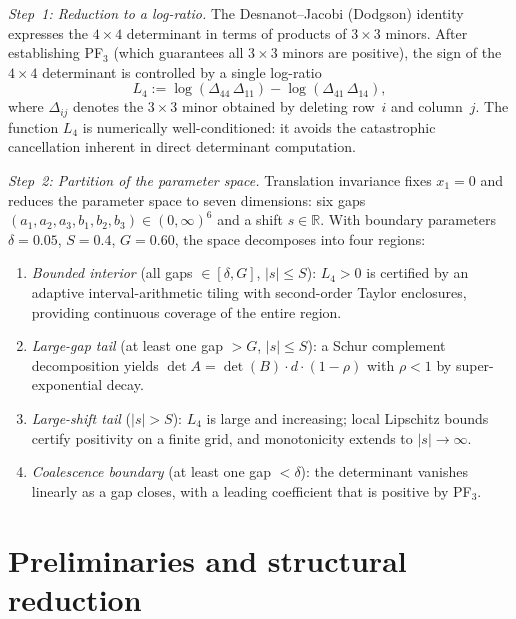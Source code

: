 \documentclass[11pt,a4paper]{amsart}
\theoremstyle{definition}
\theoremstyle{remark}
\newcommand{\R}{\mathbb{R}}
\begin{document}
\emph{Step~1: Reduction to a log-ratio.}
The Desnanot--Jacobi (Dodgson) identity expresses the $4\times 4$
determinant in terms of products of $3\times 3$ minors.
After establishing PF$_3$ (which guarantees all $3\times 3$ minors
are positive), the sign of the $4\times 4$ determinant is controlled
by a single log-ratio
\[
  L_4 := \log(\Delta_{44}\,\Delta_{11}) - \log(\Delta_{41}\,\Delta_{14}),
\]
where $\Delta_{ij}$ denotes the $3\times 3$ minor obtained by
deleting row~$i$ and column~$j$.
The function $L_4$ is numerically well-conditioned:
it avoids the catastrophic cancellation inherent in direct
determinant computation.

\emph{Step~2: Partition of the parameter space.}
Translation invariance fixes $x_1 = 0$ and reduces the parameter
space to seven dimensions: six gaps $(a_1, a_2, a_3, b_1, b_2, b_3)
\in (0,\infty)^6$ and a shift $s \in \R$.
With boundary parameters $\delta = 0.05$, $S = 0.4$, $G = 0.60$,
the space decomposes into four regions:

\begin{enumerate}[label=(\roman*)]
  \item \emph{Bounded interior}
        (all gaps $\in [\delta, G]$, $|s| \le S$):
        $L_4 > 0$ is certified by an adaptive
        interval-arithmetic tiling with second-order Taylor
        enclosures, providing continuous coverage of the
        entire region.
  \item \emph{Large-gap tail}
        (at least one gap $> G$, $|s| \le S$):
        a Schur complement decomposition yields
        $\det A = \det(B) \cdot d \cdot (1 - \rho)$
        with $\rho < 1$ by super-exponential decay.
  \item \emph{Large-shift tail} ($|s| > S$):
        $L_4$ is large and increasing; local Lipschitz bounds
        certify positivity on a finite grid, and monotonicity
        extends to $|s| \to \infty$.
  \item \emph{Coalescence boundary}
        (at least one gap $< \delta$):
        the determinant vanishes linearly as a gap closes,
        with a leading coefficient that is positive by PF$_3$.
\end{enumerate}


\section{Preliminaries and structural reduction}\label{sec:prelim}
\end{document}
